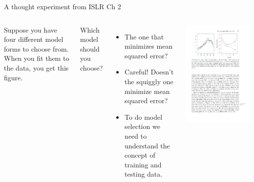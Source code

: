 \documentclass[aspectratio=169]{beamer}
\begin{document}
\begin{frame}{A thought experiment from ISLR Ch 2}

\begin{columns}
Suppose you have four different model forms to choose from.  When you fit them to the data, you get this figure.

\vspace{5mm}

Which model should you choose?  
\begin{itemize}
\item<2-> The one that minimizes mean squared error?
\item<3-> Careful!  Doesn't the squiggly one minimize mean squared error?
\item<4-> To do model selection we need to understand the concept of training and testing data.
\end{itemize}

\includegraphics[scale=1]{figures/islr2_9a.pdf}
\end{columns}

\end{frame}
\end{document}
